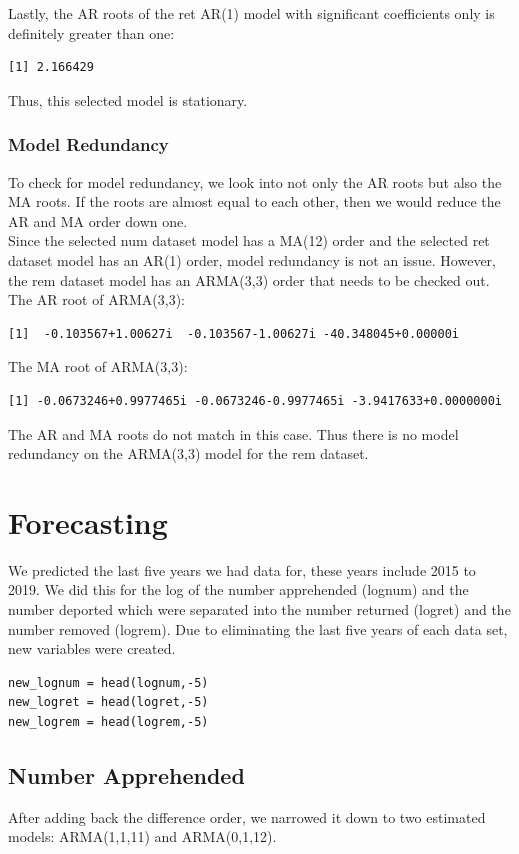 \documentclass[a4paper]{article}
\begin{document}
Lastly, the AR roots of the ret AR(1) model with significant coefficients only is definitely greater than one:
\begin{verbatim}
[1] 2.166429
\end{verbatim}
Thus, this selected model is stationary.

\subsubsection{Model Redundancy}
To check for model redundancy, we look into not only the AR roots but also the MA roots. If the roots are almost equal to each other, then we would reduce the AR and MA order down one. \\

Since the selected num dataset model has a MA(12) order and the selected ret dataset model has an AR(1) order, model redundancy is not an issue. However, the rem dataset model has an ARMA(3,3) order that needs to be checked out. \\

The AR root of ARMA(3,3):
\begin{verbatim}
[1]  -0.103567+1.00627i  -0.103567-1.00627i -40.348045+0.00000i
\end{verbatim}

The MA root of ARMA(3,3):
\begin{verbatim}
[1] -0.0673246+0.9977465i -0.0673246-0.9977465i -3.9417633+0.0000000i
\end{verbatim}

The AR and MA roots do not match in this case. Thus there is no model redundancy on the ARMA(3,3) model for the rem dataset.

\section{Forecasting}
We predicted the last five years we had data for, these years include 2015 to 2019. We did this for the log of the number apprehended (lognum) and the number deported which were separated into the number returned (logret) and the number removed (logrem). Due to eliminating the last five years of each data set, new variables were created. \\

\begin{verbatim}
new_lognum = head(lognum,-5)
new_logret = head(logret,-5)
new_logrem = head(logrem,-5) 
\end{verbatim}

\subsection{Number Apprehended}
After adding back the difference order, we narrowed it down to two estimated models: ARMA(1,1,11) and ARMA(0,1,12). \\
\end{document}
